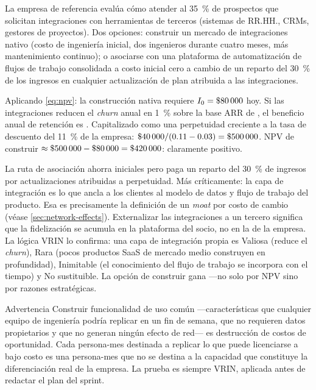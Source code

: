 \begin{example}
La empresa de referencia evalúa cómo atender al \qty{35}{\percent} de prospectos que solicitan
integraciones con herramientas de terceros (sistemas de RR.HH., CRMs, gestores de proyectos).
Dos opciones: construir un mercado de integraciones nativo (costo de ingeniería 
inicial, dos ingenieros durante cuatro meses, más mantenimiento continuo); o asociarse con
una plataforma de automatización de flujos de trabajo consolidada a costo inicial cero a
cambio de un reparto del \qty{30}{\percent} de los ingresos en cualquier actualización de
plan atribuida a las integraciones.

Aplicando \cref{eq:npv}: la construcción nativa requiere \(I_0 = \$\num{80000}\) hoy. Si las
integraciones reducen el \emph{churn} anual en \qty{1}{\percent} sobre la base ARR de
, el beneficio anual de retención es . Capitalizado como una
perpetuidad creciente a la tasa de descuento del \qty{11}{\percent} de la empresa:
\(\$\num{40000}/(0.11 - 0.03) = \$\num{500000}\).
NPV de construir \(\approx \$\num{500000} - \$\num{80000} = \$\num{420000}\): claramente
positivo.

La ruta de asociación ahorra  iniciales pero paga un reparto del \qty{30}{\percent}
de ingresos por actualizaciones atribuidas a perpetuidad. Más críticamente: la capa de
integración es lo que ancla a los clientes al modelo de datos y flujo de trabajo del
producto. Esa es precisamente la definición de un \emph{moat} por costo de cambio (véase
\cref{sec:network-effects}). Externalizar las integraciones a un tercero significa que la
fidelización se acumula en la plataforma del socio, no en la de la empresa. La lógica VRIN
lo confirma: una capa de integración propia es Valiosa (reduce el \emph{churn}), Rara
(pocos productos SaaS de mercado medio construyen en profundidad), Inimitable (el
conocimiento del flujo de trabajo se incorpora con el tiempo) y No sustituible. La opción
de construir gana ---no solo por NPV sino por razones estratégicas.
\end{example}

\begin{admonition}{Advertencia}
Construir funcionalidad de uso común ---características que cualquier equipo de ingeniería
podría replicar en un fin de semana, que no requieren datos propietarios y que no generan
ningún efecto de red--- es destrucción de costos de oportunidad. Cada persona-mes destinada
a replicar lo que puede licenciarse a bajo costo es una persona-mes que no se destina a la
capacidad que constituye la diferenciación real de la empresa. La prueba es siempre VRIN,
aplicada antes de redactar el plan del sprint.
\end{admonition}

